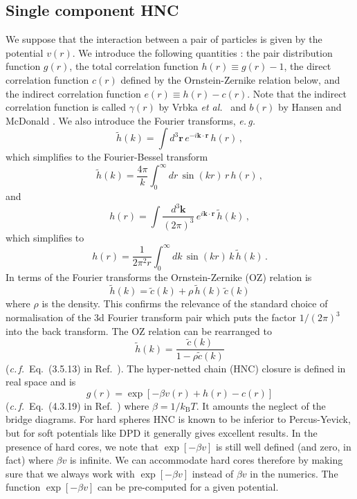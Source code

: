\documentclass[12pt,a4paper]{article}
\newcommand{\latin}[1]{\emph{#1}}
\newcommand{\etal}{\latin{et al.}}
\newcommand{\eg}{\latin{e.\,g.}}
\newcommand{\cf}{\latin{c.\,f.}}
\newcommand{\kB}{k_{\mathrm{B}}}
\newcommand{\kT}{\kB T}
\newcommand{\myvec}[1]{{\mathbf #1}}
\newcommand{\rvec}{\myvec{r}}
\newcommand{\kvec}{\myvec{k}}
\newcommand{\Refcite}[1]{Ref.~\cite{#1}}
\begin{document}
\subsection{Single component HNC}
%
We suppose that the interaction between a pair of particles is given
by the potential $v(r)$.  We introduce the following quantities
\cite{HM06}: the pair distribution function $g(r)$, the total
correlation function $h(r)\equiv g(r)-1$, the direct correlation
function $c(r)$ defined by the Ornstein-Zernike relation below, and
the indirect correlation function $e(r)\equiv h(r)-c(r)$.  Note that
the indirect correlation function is called $\gamma(r)$ by Vrbka
\etal\ \cite{Vrbka09} and $b(r)$ by Hansen and McDonald \cite{HM06}.  We
also introduce the Fourier transforms, \eg\
%
\begin{equation}
\tilde h(k) = \int\!d^3\rvec\, e^{-i\kvec\cdot\rvec} \,h(r)\,,
\end{equation}
%
which simplifies to the Fourier-Bessel transform
%
\begin{equation}
\tilde h(k) = \frac{4\pi}{k} \int_0^\infty \!\! dr\, \sin(kr)\, r\, h(r)\,,
\label{eq:fFB}
\end{equation}
%
and
%
\begin{equation}
h(r) = \int\! \frac{d^3\kvec}{(2\pi)^3} \,e^{i\kvec\cdot\rvec} \,\tilde h(k)\,,
\end{equation}
%
which simplifies to 
%
\begin{equation}
h(r) = \frac{1}{2 \pi^2 r} \int_0^\infty \!\!dk\, \sin(kr)\, k\, \tilde h(k)\,.
\label{eq:bFB}
\end{equation}
%
In terms of the Fourier transforms the Ornstein-Zernike (OZ) relation
is
%
\begin{equation}
\tilde h(k) = \tilde c(k) + \rho\,
\tilde h(k)\, \tilde c(k)
\label{eq:oz1a}
\end{equation}
%
where $\rho$ is the density.  This confirms the relevance of the
standard choice of normalisation of the 3d Fourier transform pair
which puts the factor $1/(2\pi)^3$ into the back transform.  The OZ
relation can be rearranged to 
%
\begin{equation}
\tilde h(k) = \frac{\tilde c(k)}{1-\rho \tilde c(k)}
\label{eq:oz1b}
\end{equation}
%
(\cf\ Eq.~(3.5.13) in \Refcite{HM06}).
The hyper-netted chain (HNC) closure is defined in real space and is
%
\begin{equation}
g(r)=\exp[-\beta v(r)+h(r)-c(r)]
\label{eq:hnc1a}
\end{equation}
%
(\cf\ Eq.~(4.3.19) in \Refcite{HM06}) where $\beta=1/\kT$.  It
amounts the neglect of the bridge diagrams.  For hard spheres HNC is
known to be inferior to Percus-Yevick, but for soft potentials like
DPD it generally gives excellent results.  In the presence of hard
cores, we note that $\exp[-\beta v]$ is still well defined (and zero,
in fact) where $\beta v$ is infinite.  We can accommodate hard cores
therefore by making sure that we always work with $\exp[-\beta v]$
instead of $\beta v$ in the numerics.  The function $\exp[-\beta v]$
can be pre-computed for a given potential.
\end{document}
